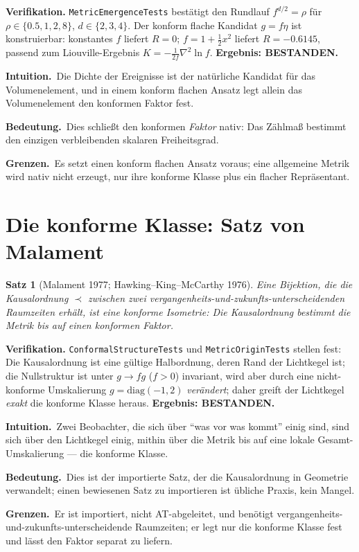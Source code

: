 \documentclass[10pt,twoside,openany]{book}
\newtheorem{theorem}{Satz}[chapter]
\newcommand{\theoremnotes}[3]{%
  \par\medskip\noindent
  \textbf{Intuition.}\ #1\par
  \textbf{Bedeutung.}\ #2\par
  \textbf{Grenzen.}\ #3\par}
\begin{document}
\textbf{Verifikation.} \texttt{MetricEmergenceTests} bestätigt den Rundlauf
$f^{d/2}=\rho$ für $\rho\in\{0.5,1,2,8\}$, $d\in\{2,3,4\}$. Der konform flache Kandidat
$g=f\eta$ ist konstruierbar: konstantes $f$ liefert $R=0$; $f=1+\tfrac12 x^2$ liefert
$R=-0.6145$, passend zum Liouville-Ergebnis $K=-\tfrac1{2f}\nabla^2\ln f$.
\textbf{Ergebnis: BESTANDEN.}

\theoremnotes
{Die Dichte der Ereignisse ist der natürliche Kandidat für das Volumenelement, und in
einem konform flachen Ansatz legt allein das Volumenelement den konformen Faktor fest.}
{Dies schließt den konformen \emph{Faktor} nativ: Das Zählmaß bestimmt den einzigen
verbleibenden skalaren Freiheitsgrad.}
{Es setzt einen konform flachen Ansatz voraus; eine allgemeine Metrik wird nativ nicht
erzeugt, nur ihre konforme Klasse plus ein flacher Repräsentant.}

\section{Die konforme Klasse: Satz von Malament}

\begin{theorem}[Malament 1977; Hawking--King--McCarthy 1976]
Eine Bijektion, die die Kausalordnung $\prec$ zwischen zwei
vergangenheits-und-zukunfts-unterscheidenden Raumzeiten erhält, ist eine konforme
Isometrie: Die Kausalordnung bestimmt die Metrik \emph{bis auf einen konformen Faktor}.
\end{theorem}

\textbf{Verifikation.} \texttt{ConformalStructureTests} und \texttt{MetricOriginTests}
stellen fest: Die Kausalordnung ist eine gültige Halbordnung, deren Rand der Lichtkegel
ist; die Nullstruktur ist unter $g\to f g$ ($f>0$) invariant, wird aber durch eine
nicht-konforme Umskalierung $g=\mathrm{diag}(-1,2)$ \emph{verändert}; daher greift der
Lichtkegel \emph{exakt} die konforme Klasse heraus. \textbf{Ergebnis: BESTANDEN.}

\theoremnotes
{Zwei Beobachter, die sich über ``was vor was kommt'' einig sind, sind sich über den
Lichtkegel einig, mithin über die Metrik bis auf eine lokale Gesamt-Umskalierung --- die
konforme Klasse.}
{Dies ist der importierte Satz, der die Kausalordnung in Geometrie verwandelt; einen
bewiesenen Satz zu importieren ist übliche Praxis, kein Mangel.}
{Er ist importiert, nicht AT-abgeleitet, und benötigt
vergangenheits-und-zukunfts-unterscheidende Raumzeiten; er legt nur die konforme Klasse
fest und lässt den Faktor separat zu liefern.}
\end{document}
